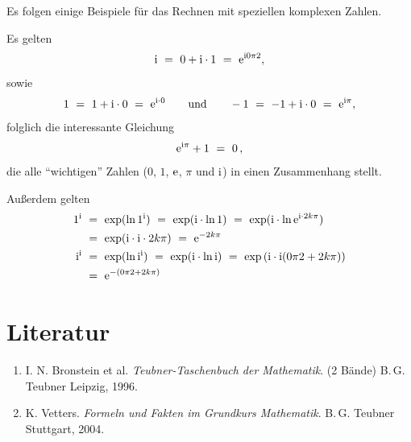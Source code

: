 Es folgen einige Beispiele für das Rechnen mit speziellen komplexen Zahlen.

Es gelten
\[
\imag
\ =\ 0+\imag\cdot1
\ =\ \e^{\imag\frac{\pi}{2}}
,
\]
sowie
\[
1
\ =\ 1+\mathrm{i}\cdot0
\ =\ \mathrm{e}^{\mathrm{i}\cdot0}
\qquad\text{und}\qquad
-1
\ =\ -1+\mathrm{i}\cdot0
\ =\ \mathrm{e}^{\mathrm{i}\pi}
,
\]
folglich die interessante Gleichung
\[
\mathrm{e}^{\mathrm{i}\pi}+1
\ =\ 0
\,,
\]
die alle "`wichtigen"' Zahlen ($0$, $1$, $\mathrm{e}$, $\pi$ und $\mathrm{i}$) in einen Zusammenhang stellt.

Außerdem gelten
\begin{align*}
1^\imag
&\ =\ \exp(\ln 1^\imag)
\ =\ \exp(\imag\cdot\ln 1)
\ =\ \exp(\imag\cdot\ln\e^{\imag\cdot2k\pi})
\\
&\ =\ \exp(\imag\cdot\imag\cdot2k\pi)
\ =\ \e^{-2k\pi}
\\
\imag^\imag
&\ =\ \exp(\ln \imag^\imag)
\ =\ \exp(\imag\cdot\ln \imag)
\ =\ \exp\left(\imag\cdot\imag(\frac{\pi}{2}+2k\pi)\right)
\\
&\ =\ \e^{-(\frac{\pi}{2}+2k\pi)}
\end{align*}





\section{Literatur}

\renewcommand{\labelenumi}{[\arabic{enumi}]}
\renewcommand{\theenumi}{[\arabic{enumi}]}
\begin{enumerate}
\item
I. N. Bronstein et al. \textit{Teubner-Taschenbuch der Mathematik}. (2 Bände)
B.\,G. Teubner Leipzig, 1996.

\item
K. Vetters. \textit{Formeln und Fakten im Grundkurs Mathematik}. B.\,G. Teubner Stuttgart, 2004.

\end{enumerate}
\pagestyle{scrplain}
\ofoot[]{}

\cleardoublepage
%
